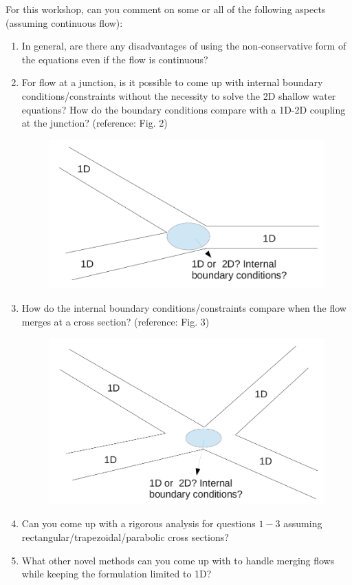 \documentclass[a4paper, 11pt]{article}
\begin{document}
For this workshop, can you comment on some or all of the following aspects (assuming continuous flow): 
\begin{enumerate}
\item In general, are there any disadvantages of using the non-conservative form of the equations even if the flow is continuous? 
\item For flow at a junction, is it possible to come up with internal boundary conditions/constraints without the necessity to solve the 2D shallow water equations? How do the boundary conditions compare with a 1D-2D coupling at the junction? (reference: Fig. 2)
\begin{figure}[htb]
\centering
\includegraphics[width=0.5\linewidth]{./junction_1.png}
\caption{}
\end{figure}

\item How do the internal boundary conditions/constraints compare when the flow merges at a cross section? (reference: Fig. 3)
\begin{figure}
\centering
\includegraphics[width=.5\linewidth]{./junction_2.png}
\caption{}
\end{figure}
\item Can you come up with a rigorous analysis for questions $1-3$ assuming rectangular/trapezoidal/parabolic cross sections? 
\item What other novel methods can you come up with to handle merging flows while keeping the formulation limited to 1D?
\end{enumerate}






{}

\end{document}

